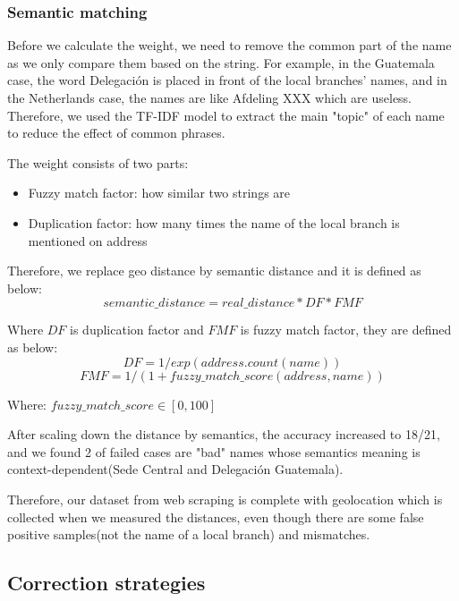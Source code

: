 \documentclass[sigchi]{acmart}
\begin{document}
\subsubsection{Semantic matching}

Before we calculate the weight, we need to remove the common part of the name as we only compare them based on the string. For example, in the Guatemala case, the word Delegación is placed in front of the local branches' names, and in the Netherlands case, the names are like Afdeling XXX which are useless. Therefore, we used the TF-IDF model to extract the main "topic" of each name to reduce the effect of common phrases.

The weight consists of two parts:
\begin{itemize}
    \item Fuzzy match factor: how similar two strings are
    \item Duplication factor: how many times the name of the local branch is mentioned on address
\end{itemize}

Therefore, we replace geo distance by semantic distance and it is defined as below:
\begin{equation}
    semantic\_distance = real\_distance*DF*FMF
\end{equation}

Where $DF$ is duplication factor and $FMF$ is fuzzy match factor, they are defined as below:
\begin{equation}
    DF= 1/exp(address.count(name))
\end{equation}
\begin{equation}
    FMF= 1/(1+fuzzy\_match\_score (address,name))
\end{equation}

Where: $fuzzy\_match\_score \in [0,100]$

After scaling down the distance by semantics, the accuracy increased to 18/21, and we found 2 of failed cases are "bad" names whose semantics meaning is context-dependent(Sede Central and Delegación Guatemala).

Therefore, our dataset from web scraping is complete with geolocation which is collected when we measured the distances, even though there are some false positive samples(not the name of a local branch) and mismatches.

\subsection{Correction strategies}
\end{document}
